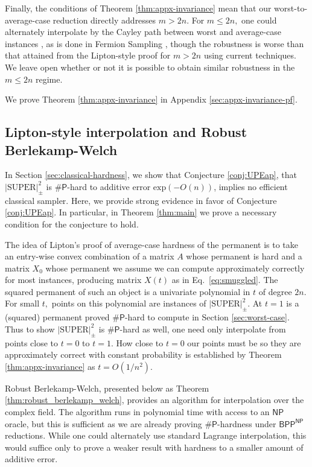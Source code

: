 \documentclass[11pt]{article}
\theoremstyle{plain}
\theoremstyle{plain}
\theoremstyle{plain}
\theoremstyle{plain}
\theoremstyle{plain}
\theoremstyle{plain}
\theoremstyle{plain}
\theoremstyle{remark}
\theoremstyle{remark}
\theoremstyle{plain}
\theoremstyle{plain}
\theoremstyle{plain}
\theoremstyle{plain}
\newcommand{\superap}{\lvert \mathrm{SUPER}\rvert^2_\pm}
\renewcommand{\exp}{\mathrm{exp}}
\newcommand{\sharP}{\#\mathsf{P}}
\begin{document}
Finally, the conditions of Theorem \ref{thm:appx-invariance} mean that our worst-to-average-case reduction directly addresses $m>2n.$ For $m\leq 2n,$ one could alternately interpolate by the Cayley path between worst and average-case instances \cite{movassagh_quantum_2020,movassagh2023hardness}, as is done in Fermion Sampling \cite{fermionsampling}, though the robustness is worse than that attained from the Lipton-style proof for $m>2n$ using current techniques. We leave open whether or not it is possible to obtain similar robustness in the $m\leq 2n$ regime. 


We prove Theorem \ref{thm:appx-invariance} in Appendix \ref{sec:appx-invariance-pf}. 


\subsection{Lipton-style interpolation and Robust Berlekamp-Welch} 

In Section \ref{sec:classical-hardness}, we show that Conjecture \ref{conj:UPEap}, that $\superap$ is $\sharP$-hard to additive error $\exp(-O(n))$, implies no efficient classical sampler. Here, we provide strong evidence in favor of Conjecture \ref{conj:UPEap}. In particular, in Theorem \ref{thm:main} we prove a necessary condition for the conjecture to hold. 

The idea of Lipton's proof of average-case hardness of the permanent is to take an entry-wise convex combination of a matrix $A$ whose permanent is hard and a matrix $X_0$ whose permanent we assume we can compute approximately correctly for most instances,
producing matrix $X(t)$ as in Eq.~\ref{eq:smuggled}. The squared permanent of such an object is a univariate polynomial in $t$ of degree $2n.$ For small $t,$ points on this polynomial are instances of $\superap.$ At $t=1$ is a (squared) permanent proved $\sharP$-hard to compute in Section \ref{sec:worst-case}. Thus to show $\superap$ is $\sharP$-hard as well, one need only interpolate from points close to $t=0$ to $t=1.$ 
How close to $t=0$ our points must be so they are approximately correct with constant probability is established by Theorem \ref{thm:appx-invariance} as $t=O(1/n^2).$

Robust Berlekamp-Welch, presented below as Theorem \ref{thm:robust_berlekamp_welch}, provides an algorithm for interpolation over the complex field. The algorithm runs in polynomial time with access to an $\textsf{NP}$ oracle, but this is sufficient as we are already proving $\sharP$-hardness under $\mathsf{BPP}^\mathsf{NP}$ reductions.
While one could alternately use standard Lagrange interpolation, this would suffice only to prove a weaker result with hardness to a smaller amount of additive error.
\end{document}
